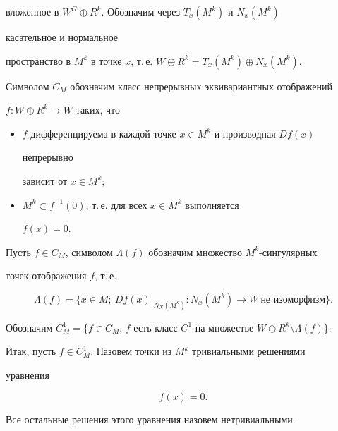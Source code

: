 вложенное в $W^G\oplus R^k$. Обозначим через $T_x(M^k)$ и $N_x(M^k)$ 


касательное и нормальное 


пространство в $M^k$ в точке $x$, т.\,е. $W\oplus R^k=T_x(M^k)\oplus 


N_x(M^k)$. 


 


Символом $C_M$ обозначим класс непрерывных эквивариантных отображений 


$f:W\oplus R^k\to W$ таких, что 


\begin{itemize} 


\item[1)] $f$ дифференцируема в каждой точке $x\in M^k$ и производная $Df(x)$ 


непрерывно 


зависит от $x\in M^k$; 


\item[2)] $M^k\subset f^{-1}(0)$, т.\,е. для всех $x\in M^k$ выполняется 


$f(x)=0$. 


\end{itemize} 


Пусть $f\in C_M$, символом $\Lambda(f)$ обозначим множество $M^k$-сингулярных 


точек отображения $f$, т.\,е. 


$$ 


\Lambda(f)=\{x\in M;\ Df(x)|_{N_X(M^k)}: 


N_x(M^k)\to W\ \text{не изоморфизм}\}. 


$$ 


Обозначим $C^1_M=\{f\in C_M$, $f$ есть класс $C^1$ на множестве $W\oplus 


R^k\setminus\Lambda(f)\}$. 


 


Итак, пусть $f\in C^1_M$. Назовем точки из $M^k$ тривиальными решениями 


уравнения 


\begin{equation} 


f(x)=0. 


\end{equation} 


Все остальные решения этого уравнения назовем нетривиальными. 


\medskip 


